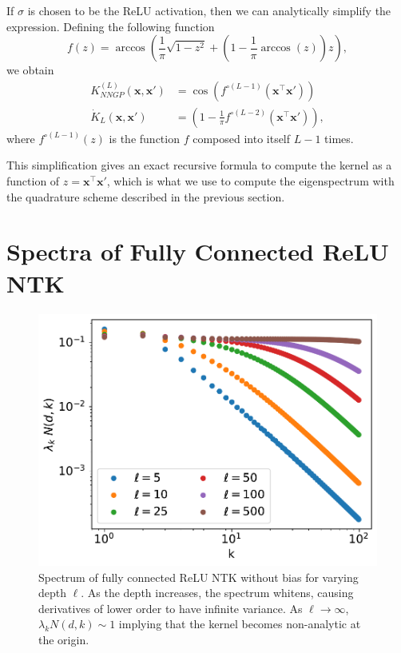 \documentclass{article}
\begin{document}
If $\sigma$ is chosen to be the ReLU activation, then we can analytically simplify the expression. Defining the following function
\begin{equation}
    f(z) = \arccos\left( \frac{1}{\pi} \sqrt{1-z^2} + \left(1-\frac{1}{\pi} \arccos(z) \right) z \right),
\end{equation}
we obtain
\begin{align}
\nonumber
    K_{NNGP}^{(L)}(\mathbf{x},\mathbf{x}') &= \cos\left( f^{\circ (L-1)}(\mathbf{x}^\top \mathbf{x}') \right)
    \\
    \dot{K}_{L}(\mathbf{x},\mathbf{x}') &= \left(1-\frac{1}{\pi} f^{\circ (L-2)}(\mathbf{x}^\top \mathbf{x}') \right),
\end{align}
where $f^{\circ (L-1)}(z)$ is the function $f$ composed into itself $L-1$ times. 

This simplification gives an exact recursive formula to compute the kernel as a function of $z = \mathbf{x}^\top \mathbf{x}'$, which is what we use to compute the eigenspectrum with the quadrature scheme described in the previous section. 


\section{Spectra of Fully Connected ReLU NTK}\label{SISpectraNTK}


\begin{figure}
    \centering
    \includegraphics[width=0.8\linewidth]{ntk_spectra.pdf}
    \caption{Spectrum of fully connected ReLU NTK without bias for varying depth $\ell$. As the depth increases, the spectrum whitens, causing derivatives of lower order to have infinite variance. As $\ell \to \infty$, $\lambda_k N(d,k) \sim 1$ implying that the kernel becomes non-analytic at the origin.}
    \label{fig:NTK_spectra}
\end{figure}
\end{document}
